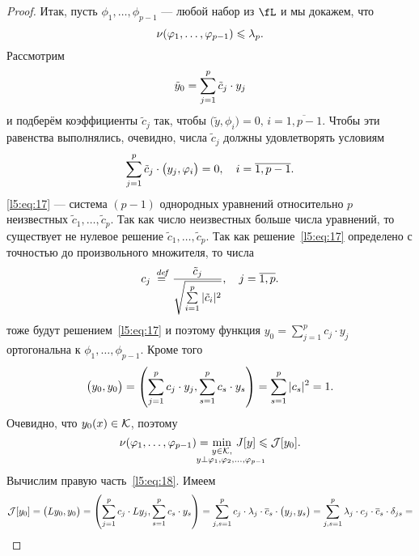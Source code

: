 \begin{proof}
	Итак, пусть $\phi_1,\ldots,\phi_{p-1}$ --- любой набор из $\fL$ и мы докажем, что
	\begin{equation}
		\label{l5:eq:16}
		\hfill\nu(\phi_1,\ldots,\phi_{p-1})\leqslant\lambda_p.\hfill
	\end{equation}  
	Рассмотрим 
	\begin{equation*}
		\hfill \tilde{y}_0=\sum\limits_{j=1}^{p}\tilde{c}_j\cdot y_j\hfill
	\end{equation*}
	и подберём коэффициенты $\tilde{c}_j$ так, чтобы $\big(\tilde{y},\phi_i\big)=0,\,i=\overline{1,p-1}$. Чтобы эти равенства выполнялись, очевидно, числа $\tilde{c}_j$ должны удовлетворять условиям
	\begin{equation}
		\label{l5:eq:17}
		\hfill \sum\limits_{j=1}^{p}\tilde{c}_j\cdot \big(y_j,\phi_i\big)=0,\quad i=\overline{1,p-1}.\hfill
	\end{equation} 
	\eqref{l5:eq:17} --- система $(p-1)$ однородных уравнений относительно $p$ неизвестных $\tilde{c}_1,\ldots,\tilde{c}_p$. Так как число неизвестных больше числа уравнений, то существует не нулевое решение $\tilde{c}_1,\ldots,\tilde{c}_p$. Так как решение~\eqref{l5:eq:17} определено с точностью до произвольного множителя, то числа 
	\begin{equation*}
		\hfill c_j\eqdef\frac{\tilde{c}_j}{\sqrt{\sum\limits_{i=1}^p|\tilde{c}_i|^2}},\quad j=\overline{1,p}.\hfill
	\end{equation*}
	тоже будут решением~\eqref{l5:eq:17} и поэтому функция $\displaystyle y_0=\sum\limits_{j=1}^{p}c_j\cdot y_j$ ортогональна к $\phi_1,\ldots,\phi_{p-1}$. Кроме того
	\begin{equation*}
		\hfill\big(y_0,y_0\big)=\left(\sum\limits_{j=1}^{p}c_j\cdot y_j,\sum\limits_{s=1}^{p}c_s\cdot y_s\right)=\sum\limits_{s=1}^p|c_s|^2=1.\hfill
	\end{equation*}
	Очевидно, что $y_0(x)\in\mathcal{K}$, поэтому
	\begin{equation}
		\label{l5:eq:18}
		\hfill\nu(\phi_1,\ldots,\phi_{p-1})=\min\limits_{\substack{y\in\K,\\\lefteqn{\scriptstyle \hspace*{-0.8cm}y\perp\phi_1,\phi_2,\ldots,\phi_{p-1}}}}\,J[y]\leqslant\J[y_0].\hfill
	\end{equation} 
	Вычислим правую часть~\eqref{l5:eq:18}. Имеем
	\begin{multline}
		\label{l5:eq:19}
		\J[y_0]=\big(Ly_0,y_0\big)=\left(\sum\limits_{j=1}^{p}c_j\cdot Ly_j,\sum\limits_{s=1}^{p}c_s\cdot y_s\right)=\sum\limits_{j,s=1}^{p}c_j\cdot\lambda_j\cdot\overline{c}_s\cdot\big(y_j,y_s\big)=\sum\limits_{j,s=1}^{p}\lambda_j\cdot c_j\cdot\overline{c}_s\cdot\delta_{js}=\\

\end{multline}
\end{proof}
